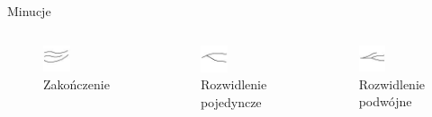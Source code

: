 \documentclass{beamer}
\begin{document}
\begin{frame}{Minucje}
\begin{columns}
		    \begin{figure}[t]
			    \centering
                \includegraphics[width=0.4\textwidth]{fingerprints/minucje/zakonczenie.jpg}
                \caption*{Zakończenie}
            \end{figure}
            \begin{figure}[t]
			    \centering
                \includegraphics[width=0.4\textwidth]{fingerprints/minucje/rozwidlenie1.jpg}
                \caption*{Rozwidlenie pojedyncze}
            \end{figure}
            \begin{figure}[t]
			    \centering
                \includegraphics[width=0.4\textwidth]{fingerprints/minucje/rozwidlenie2.jpg}
                \caption*{Rozwidlenie podwójne}
            \end{figure}
    \end{columns}
    

\end{frame}
\end{document}
